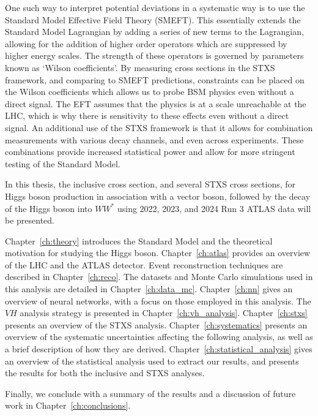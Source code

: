 One such way to interpret potential deviations in a systematic way is to use the Standard Model Effective Field Theory (SMEFT). This essentially extends the Standard Model Lagrangian by adding a series of new terms to the Lagrangian, allowing for the addition of higher order operators which are suppressed by higher energy scales. The strength of these operators is governed by parameters known as `Wilson coefficients'. By measuring cross sections in the STXS framework, and comparing to SMEFT predictions, constraints can be placed on the Wilson coefficients which allows us to probe BSM physics even without a direct signal. The EFT assumes that the physics is at a scale unreachable at the LHC, which is why there is sensitivity to these effects even without a direct signal.
An additional use of the STXS framework is that it allows for combination measurements with various decay channels, and even across experiments. These combinations provide increased statistical power and allow for more stringent testing of the Standard Model.

In this thesis, the inclusive cross section, and several STXS cross sections, for Higgs boson production in association with a vector boson, followed by the decay of the Higgs boson into $WW^{*}$ using 2022, 2023, and 2024 Run 3 ATLAS data will be presented. 

Chapter~\ref{ch:theory} introduces the Standard Model and the theoretical motivation for studying the Higgs boson. Chapter~\ref{ch:atlas} provides an overview of the LHC and the ATLAS detector. Event reconstruction techniques are described in Chapter~\ref{ch:reco}. The datasets and Monte Carlo simulations used in this analysis are detailed in Chapter~\ref{ch:data_mc}. Chapter~\ref{ch:nn} gives an overview of neural networks, with a focus on those employed in this analysis. The $VH$ analysis strategy is presented in Chapter~\ref{ch:vh_analysis}. Chapter~\ref{ch:stxs} presents an overview of the STXS analysis. Chapter~\ref{ch:systematics} presents an overview of the systematic uncertainties affecting the following analysis, as well as a brief description of how they are derived. Chapter~\ref{ch:statistical_analysis} gives an overview of the statistical analysis used to extract our results, and presents the results for both the inclusive and STXS analyses.

Finally, we conclude with a summary of the results and a discussion of future work in Chapter~\ref{ch:conclusions}.
